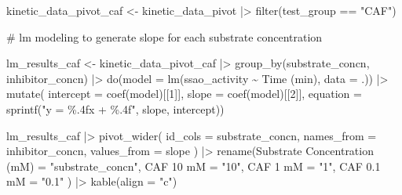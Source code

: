 \documentclass[
  letterpaper,
  DIV=11,
  numbers=noendperiod]{scrreprt}
\newenvironment{Shaded}{\begin{snugshade}}{\end{snugshade}}
\newcommand{\AttributeTok}[1]{\textcolor[rgb]{0.40,0.45,0.13}{#1}}
\newcommand{\CommentTok}[1]{\textcolor[rgb]{0.37,0.37,0.37}{#1}}
\newcommand{\DecValTok}[1]{\textcolor[rgb]{0.68,0.00,0.00}{#1}}
\newcommand{\FunctionTok}[1]{\textcolor[rgb]{0.28,0.35,0.67}{#1}}
\newcommand{\NormalTok}[1]{\textcolor[rgb]{0.00,0.23,0.31}{#1}}
\newcommand{\OtherTok}[1]{\textcolor[rgb]{0.00,0.23,0.31}{#1}}
\newcommand{\SpecialCharTok}[1]{\textcolor[rgb]{0.37,0.37,0.37}{#1}}
\newcommand{\StringTok}[1]{\textcolor[rgb]{0.13,0.47,0.30}{#1}}
\begin{document}
\begin{Shaded}
\begin{Highlighting}[]
\NormalTok{kinetic\_data\_pivot\_caf }\OtherTok{\textless{}{-}}\NormalTok{ kinetic\_data\_pivot }\SpecialCharTok{|\textgreater{}} \FunctionTok{filter}\NormalTok{(test\_group }\SpecialCharTok{==} \StringTok{"CAF"}\NormalTok{)}


\CommentTok{\# lm modeling to generate slope for each substrate concentration}

\NormalTok{lm\_results\_caf }\OtherTok{\textless{}{-}}\NormalTok{ kinetic\_data\_pivot\_caf }\SpecialCharTok{|\textgreater{}} 
  \FunctionTok{group\_by}\NormalTok{(substrate\_concn, inhibitor\_concn) }\SpecialCharTok{|\textgreater{}} 
  \FunctionTok{do}\NormalTok{(}\AttributeTok{model =} \FunctionTok{lm}\NormalTok{(ssao\_activity }\SpecialCharTok{\textasciitilde{}} \StringTok{\textasciigrave{}}\AttributeTok{Time (min)}\StringTok{\textasciigrave{}}\NormalTok{, }\AttributeTok{data =}\NormalTok{ .)) }\SpecialCharTok{|\textgreater{}} 
  \FunctionTok{mutate}\NormalTok{(}
  \AttributeTok{intercept =} \FunctionTok{coef}\NormalTok{(model)[[}\DecValTok{1}\NormalTok{]],}
  \AttributeTok{slope =} \FunctionTok{coef}\NormalTok{(model)[[}\DecValTok{2}\NormalTok{]],}
  \AttributeTok{equation =} \FunctionTok{sprintf}\NormalTok{(}\StringTok{"y = \%.4fx + \%.4f"}\NormalTok{, slope, intercept))}

\NormalTok{lm\_results\_caf }\SpecialCharTok{|\textgreater{}} \FunctionTok{pivot\_wider}\NormalTok{(}
  \AttributeTok{id\_cols =}\NormalTok{ substrate\_concn,}
  \AttributeTok{names\_from =}\NormalTok{ inhibitor\_concn,}
  \AttributeTok{values\_from =}\NormalTok{ slope}
\NormalTok{) }\SpecialCharTok{|\textgreater{}} \FunctionTok{rename}\NormalTok{(}\StringTok{\textquotesingle{}Substrate Concentration (mM)\textquotesingle{}} \OtherTok{=} \StringTok{"substrate\_concn"}\NormalTok{,}
            \StringTok{\textquotesingle{}CAF 10 mM\textquotesingle{}} \OtherTok{=} \StringTok{"10"}\NormalTok{,}
            \StringTok{\textquotesingle{}CAF 1 mM\textquotesingle{}} \OtherTok{=} \StringTok{"1"}\NormalTok{,}
            \StringTok{\textquotesingle{}CAF 0.1 mM\textquotesingle{}} \OtherTok{=} \StringTok{"0.1"}
\NormalTok{            ) }\SpecialCharTok{|\textgreater{}} \FunctionTok{kable}\NormalTok{(}\AttributeTok{align =} \StringTok{"c"}\NormalTok{)}
\end{Highlighting}
\end{Shaded}
\end{document}
